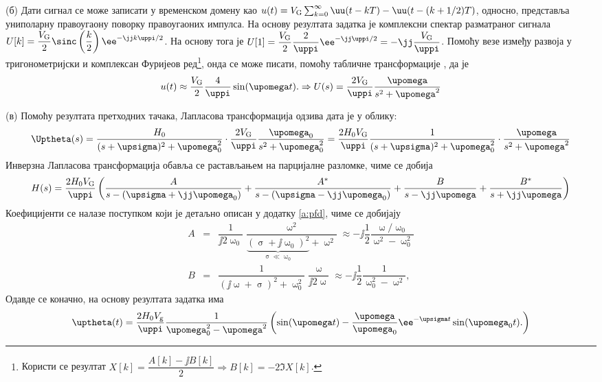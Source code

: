 (б) Дати сигнал се може записати у временском домену као 
$u(t) = V_{\rm G} \sum_{k = 0}^{\infty} \uu(t - kT) - \uu(t - (k+1/2)T)$, односно, представља униполарну правоугаону поворку 
правоугаоних импулса. 
На основу резултата задатка  је комплексни спектар разматраног сигнала
$U[k] = \dfrac{V_{\rm G}}{2} \sinc\left(\dfrac{k}{2}\right) \ee^{-\jj k \uppi / 2 } $.
На основу тога је
$U[1] = \dfrac{V_{\rm G}}{2} \dfrac{2}{\uppi} \ee^{-\jj\uppi/2} = - \jj \dfrac{V_{\rm G}}{\uppi}$.
Помоћу везе између развоја у тригонометријски и комплексан Фуријеов ред\footnote{Користи се 
резултат $X[k] = \dfrac{A[k] - \jj B[k]}{2} \Rightarrow B[k] = -2 \Im{X[k]}$.
}, онда се може писати, помоћу табличне трансформације , да је 
\begin{equation}
    u(t) \approx \dfrac{V_{\rm G}}{2}  
    \dfrac{4}{\uppi} \sin(\upomega t) .
    \Rightarrow
    U(s) = 
    \dfrac{2 V_{\rm G}}{\uppi}
    \dfrac{\upomega }{s^2 + \upomega^2}
\end{equation}

(в) Помоћу резултата претходних тачака, Лапласова трансформација одзива дата је у облику: 
\begin{equation}
    \Uptheta(s) =
    \dfrac{H_0}{(s + \upsigma)^2 + \upomega_0^2}
    \cdot
    \dfrac{2 V_{\rm G}}{\uppi}
    \dfrac{\upomega_0 }{s^2 + \upomega_0^2}
    = 
    \dfrac{2 H_0 V_{\rm G}}{\uppi}
    \dfrac{1}{(s + \upsigma)^2 + \upomega_0^2}
    \cdot
    \dfrac{\upomega }{s^2 + \upomega^2}
\end{equation}
Инверзна Лапласова трансформација обавља се растављањем на парцијалне разломке, чиме се добија 
\begin{equation}
    H(s) = 
    \dfrac{2 H_0 V_{\rm G}}{\uppi} \left(
    \dfrac{A}{ s - (\upsigma + \jj\upomega_0 ) } + \dfrac{A^\ast}{ s - (\upsigma - \jj\upomega_0 ) } 
    + \dfrac{B}{s - \jj\upomega} + \dfrac{B^*}{s + \jj\upomega}  
    \right)
\end{equation}
Коефицијенти се налазе поступком који је детаљно описан у додатку \ref{a:pfd}, чиме се добијају
\begin{eqnarray}
    A &=& \dfrac{1}{\jj2\upomega_0} \dfrac{\upomega^2}{ \underbrace{( \upsigma + \jj\upomega_0)^2}_{\upsigma \ll \upomega_0} + \upomega^2 }
   \approx 
   - \jj
   \dfrac{1}{2} \dfrac{\upomega/\upomega_0} { \upomega^2 - \upomega_0^2 } \\
   B &=& \dfrac{1}{ (\jj\upomega + \upsigma)^2 + \upomega_0^2 } \dfrac{\upomega}{\jj2\upomega}
   \approx
   - \jj 
   \dfrac{1}{2} 
   \dfrac{1}{\upomega_0^2 - \upomega^2},
\end{eqnarray}
Одавде се коначно, на основу резултата задатка  има 
\begin{equation}
    \uptheta(t) = \dfrac{2 H_0 V_{\rm g}}{\uppi}
    \dfrac{1}{\upomega_0^2 - \upomega^2}
    \left(
        \sin(\upomega t )
        -
        \dfrac{\upomega}{\upomega_0} \ee^{-\upsigma t} \sin(\upomega_0 t ). \label{\ID.odziv}
    \right)
\end{equation}

